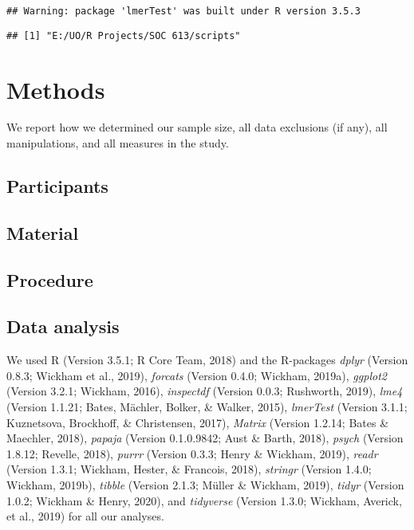 \documentclass[man]{apa6}
\begin{document}
\begin{verbatim}
## Warning: package 'lmerTest' was built under R version 3.5.3
\end{verbatim}

\begin{verbatim}
## [1] "E:/UO/R Projects/SOC 613/scripts"
\end{verbatim}

\hypertarget{methods}{%
\section{Methods}\label{methods}}

We report how we determined our sample size, all data exclusions (if any), all manipulations, and all measures in the study.

\hypertarget{participants}{%
\subsection{Participants}\label{participants}}

\hypertarget{material}{%
\subsection{Material}\label{material}}

\hypertarget{procedure}{%
\subsection{Procedure}\label{procedure}}

\hypertarget{data-analysis}{%
\subsection{Data analysis}\label{data-analysis}}

We used R (Version 3.5.1; R Core Team, 2018) and the R-packages \emph{dplyr} (Version 0.8.3; Wickham et al., 2019), \emph{forcats} (Version 0.4.0; Wickham, 2019a), \emph{ggplot2} (Version 3.2.1; Wickham, 2016), \emph{inspectdf} (Version 0.0.3; Rushworth, 2019), \emph{lme4} (Version 1.1.21; Bates, Mächler, Bolker, \& Walker, 2015), \emph{lmerTest} (Version 3.1.1; Kuznetsova, Brockhoff, \& Christensen, 2017), \emph{Matrix} (Version 1.2.14; Bates \& Maechler, 2018), \emph{papaja} (Version 0.1.0.9842; Aust \& Barth, 2018), \emph{psych} (Version 1.8.12; Revelle, 2018), \emph{purrr} (Version 0.3.3; Henry \& Wickham, 2019), \emph{readr} (Version 1.3.1; Wickham, Hester, \& Francois, 2018), \emph{stringr} (Version 1.4.0; Wickham, 2019b), \emph{tibble} (Version 2.1.3; Müller \& Wickham, 2019), \emph{tidyr} (Version 1.0.2; Wickham \& Henry, 2020), and \emph{tidyverse} (Version 1.3.0; Wickham, Averick, et al., 2019) for all our analyses.
\end{document}
